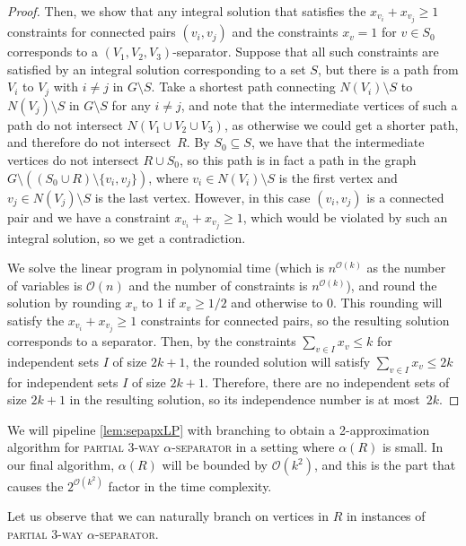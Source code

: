 \documentclass[11pt]{article}
\theoremstyle{definition}
\newcommand{\OO}{\mathcal{O}}
\begin{document}
\begin{proof}
Then, we show that any integral solution that satisfies the $x_{v_i} + x_{v_j} \ge 1$ constraints for connected pairs $(v_i, v_j)$ and the constraints $x_v = 1$ for $v \in S_0$ corresponds to a $(V_1, V_2, V_3)$-separator.
Suppose that all such constraints are satisfied by an integral solution corresponding to a set $S$, but there is a path from $V_i$ to $V_j$ with $i \neq j$ in $G \setminus S$.
Take a shortest path connecting $N(V_i) \setminus S$ to $N(V_j) \setminus S$ in $G \setminus S$ for any $i \neq j$, and note that the intermediate vertices of such a path do not intersect $N(V_1 \cup V_2 \cup V_3)$, as otherwise we could get a shorter path, and therefore do not intersect~$R$.
By $S_0 \subseteq S$, we have that the intermediate vertices do not intersect $R \cup S_0$, so this path is in fact a path in the graph $G \setminus ((S_0 \cup R) \setminus \{v_i, v_j\})$, where $v_i \in N(V_i) \setminus S$ is the first vertex and $v_j \in N(V_j) \setminus S$ is the last vertex.
However, in this case $(v_i, v_j)$ is a connected pair and we have a constraint $x_{v_i} + x_{v_j} \ge 1$, which would be violated by such an integral solution, so we get a contradiction.


We solve the linear program in polynomial time (which is $n^{\OO(k)}$ as the number of variables is $\OO(n)$ and the number of constraints is $n^{\OO(k)}$), and round the solution by rounding $x_v$ to 1 if $x_v \ge 1/2$ and otherwise to 0.
This rounding will satisfy the $x_{v_i} + x_{v_j} \ge 1$ constraints for connected pairs, so the resulting solution corresponds to a separator.
Then, by the constraints $\sum_{v \in I} x_v \le k$ for independent sets $I$ of size $2k+1$, the rounded solution will satisfy $\sum_{v \in I} x_v \le 2k$ for independent sets $I$ of size $2k+1$.
Therefore, there are no independent sets of size $2k+1$ in the resulting solution, so its independence number is at most~$2k$.
\end{proof}



We will pipeline \cref{lem:sepapxLP} with branching to obtain a 2-approximation algorithm for \textsc{partial 3-way $\alpha$-separator} in a setting where $\alpha(R)$ is small.
In our final algorithm, $\alpha(R)$ will be bounded by $\OO(k^2)$, and this is the part that causes the $2^{\OO(k^2)}$ factor in the time complexity.


Let us observe that we can naturally branch on vertices in $R$ in instances of \textsc{partial 3-way $\alpha$-separator}.
\end{document}
